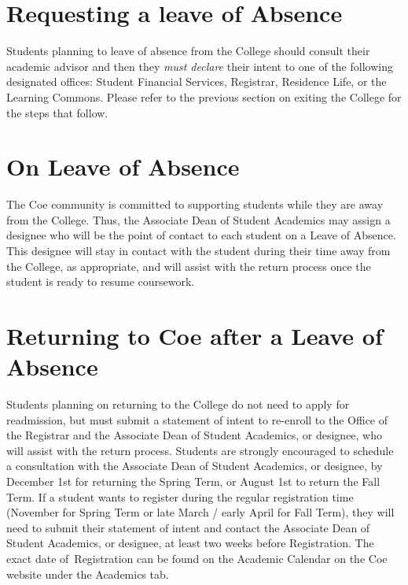 \documentclass[
  letterpaper,
]{scrbook}
\begin{document}
\section{Requesting a leave of
Absence}\label{requesting-a-leave-of-absence}

Students planning to leave of absence from the College should consult
their academic advisor and then they \emph{must declare} their intent to
one of the following designated offices: Student Financial Services,
Registrar, Residence Life, or the Learning Commons. Please refer to the
previous section on exiting the College for the steps that follow.~

\section{On Leave of Absence}\label{on-leave-of-absence}

The Coe community is committed to supporting students while they are
away from the College. Thus, the Associate Dean of Student Academics may
assign a designee who will be the point of contact to each student on a
Leave of Absence. This designee will stay in contact with the student
during their time away from the College, as appropriate, and will assist
with the return process once the student is ready to resume coursework.~

\section{Returning to Coe after a Leave of
Absence}\label{returning-to-coe-after-a-leave-of-absence}

Students planning on returning to the College do not need to apply for
readmission, but must submit a statement of intent to re-enroll to the
Office of the Registrar and the Associate Dean of Student Academics, or
designee, who will assist with the return process. Students are strongly
encouraged to schedule a consultation with the Associate Dean of Student
Academics, or designee, by December 1st for returning the Spring Term,
or August 1st to return the Fall Term. If a student wants to register
during the regular registration time (November for Spring Term or late
March / early April for Fall Term), they will need to submit their
statement of intent and contact the Associate Dean of Student Academics,
or designee, at least two weeks before Registration. The exact date
of~Registration can be found on the Academic Calendar on the Coe website
under the Academics tab.~
\end{document}
